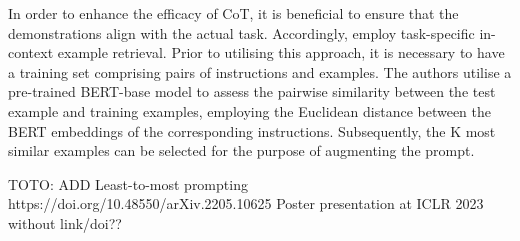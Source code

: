 \documentclass{article}
\begin{document}
In order to enhance the efficacy of CoT, it is beneficial to ensure that the demonstrations align with the actual task. Accordingly, \cite{song_llm-planner_2023} employ task-specific in-context example retrieval. Prior to utilising this approach, it is necessary to have a training set comprising pairs of instructions and examples. The authors utilise a pre-trained BERT-base model to assess the pairwise similarity between the test example and training examples, employing the Euclidean distance between the BERT embeddings of the corresponding instructions. Subsequently, the K most similar examples can be selected for the purpose of augmenting the prompt.


TOTO: ADD Least-to-most prompting 
https://doi.org/10.48550/arXiv.2205.10625 Poster presentation at ICLR 2023 without link/doi??



\end{document}
